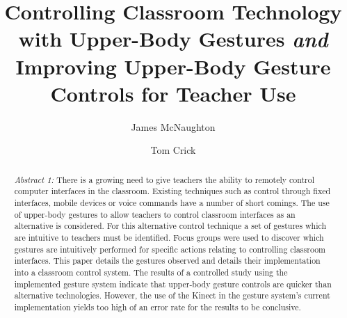 \documentclass[manuscript, review, screen]{acmart}
\begin{document}
\title{Controlling Classroom Technology with Upper-Body Gestures
  {\emph{and}} Improving Upper-Body Gesture Controls for Teacher Use}

\author{James McNaughton}
\author{Tom Crick}


\renewcommand\shortauthors{McNaughton, J. and Crick, T.}

\begin{abstract}
{\emph{Abstract 1:}} There is a growing need to give teachers the ability to remotely control computer interfaces in the classroom.
Existing techniques such as control through fixed interfaces, mobile devices or voice commands have a number of short comings.
The use of upper-body gestures to allow teachers to control classroom interfaces as an alternative is considered.
For this alternative control technique a set of gestures which are intuitive to teachers must be identified.
Focus groups were used to discover which gestures are intuitively performed for specific actions relating to controlling classroom interfaces.
This paper details the gestures observed and details their implementation into a classroom control system.
The results of a controlled study using the implemented gesture system indicate that upper-body gesture controls are quicker than alternative technologies.
However, the use of the Kinect in the gesture system's current implementation yields too high of an error rate for the results to be conclusive.


\end{abstract}
\end{document}
